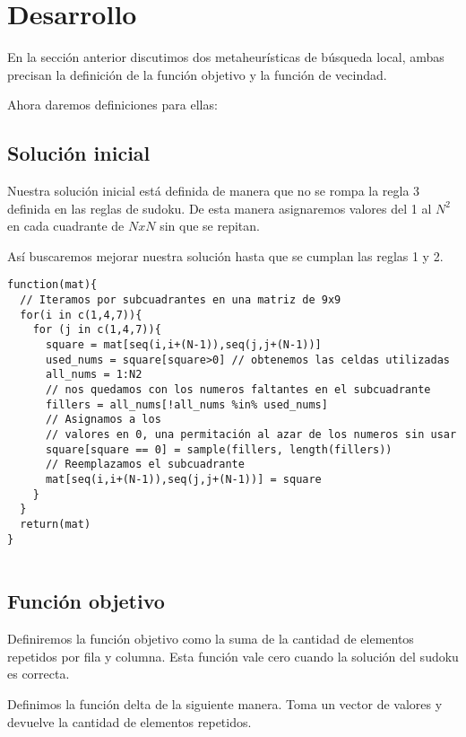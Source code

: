 \documentclass[a4paper,spanish]{article}
\begin{document}
\section{Desarrollo}


En la sección anterior discutimos dos metaheurísticas de búsqueda local, ambas
precisan la definición de la función objetivo y la función de vecindad.


Ahora daremos definiciones para ellas:


\subsection{Solución inicial}

Nuestra solución inicial está definida de manera que no se rompa la regla 3
definida en las reglas de sudoku. De esta manera asignaremos valores del 1 al
$N^2$ en cada cuadrante de $NxN$ sin que se repitan.

Así buscaremos mejorar nuestra solución hasta que se cumplan las reglas 1 y 2. 

\begin{Verbatim}[samepage=true]
function(mat){
  // Iteramos por subcuadrantes en una matriz de 9x9
  for(i in c(1,4,7)){ 
    for (j in c(1,4,7)){
      square = mat[seq(i,i+(N-1)),seq(j,j+(N-1))]
      used_nums = square[square>0] // obtenemos las celdas utilizadas
      all_nums = 1:N2
      // nos quedamos con los numeros faltantes en el subcuadrante
      fillers = all_nums[!all_nums %in% used_nums] 
      // Asignamos a los
      // valores en 0, una permitación al azar de los numeros sin usar
      square[square == 0] = sample(fillers, length(fillers)) 
      // Reemplazamos el subcuadrante
      mat[seq(i,i+(N-1)),seq(j,j+(N-1))] = square 
    }
  }
  return(mat)
}
    
\end{Verbatim}



\subsection{Función objetivo}

Definiremos la función objetivo como la suma de la cantidad de elementos
repetidos por fila y columna.  
Esta función vale cero cuando la solución del sudoku es correcta.


Definimos la función delta de la siguiente manera. Toma un vector de valores y
devuelve la cantidad de elementos repetidos.
\end{document}
